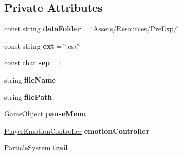 \subsection*{Private Attributes}
\begin{DoxyCompactItemize}
\item 
\mbox{\label{class_platforms_generation_pre_exp_controller_a359029b56e7129ccb4088f42bfcd2e94}} 
const string {\bfseries data\+Folder} = \char`\"{}Assets/Resources/Pre\+Exp/\char`\"{}
\item 
\mbox{\label{class_platforms_generation_pre_exp_controller_a6377e857269ad9ab5fcad63dcb978819}} 
const string {\bfseries ext} = \char`\"{}.csv\char`\"{}
\item 
\mbox{\label{class_platforms_generation_pre_exp_controller_aa7771185d555b1797fd47d3eefb114c9}} 
const char {\bfseries sep} = \textquotesingle{};\textquotesingle{}
\item 
\mbox{\label{class_platforms_generation_pre_exp_controller_a051d7a2a053c71d41ec7cfd037e4cae8}} 
string {\bfseries file\+Name}
\item 
\mbox{\label{class_platforms_generation_pre_exp_controller_a7193602609b77b9c2e75b5a232e94895}} 
string {\bfseries file\+Path}
\item 
\mbox{\label{class_platforms_generation_pre_exp_controller_a400678504e4af52426639ef01af9284a}} 
Game\+Object {\bfseries pause\+Menu}
\item 
\mbox{\label{class_platforms_generation_pre_exp_controller_acc008f85966ab0e9111d459f4baa6402}} 
\mbox{\hyperlink{class_player_emotion_controller}{Player\+Emotion\+Controller}} {\bfseries emotion\+Controller}
\item 
\mbox{\label{class_platforms_generation_pre_exp_controller_ad56745d2f4fb88b264b3f30a13a76f9c}} 
Particle\+System {\bfseries trail}

\end{DoxyCompactItemize}
